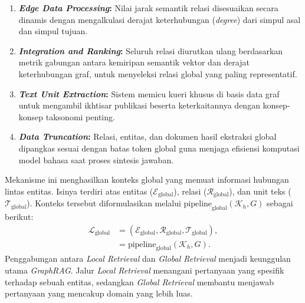 \begin{enumerate}[label=\textbf{\arabic*.}, leftmargin=*, itemsep=10pt, listparindent=0.75cm]
\begin{enumerate}[label=\textbf{\alph*.}, leftmargin=*, itemsep=5pt, listparindent=0.75cm]
\begin{enumerate}[label=\textbf{\arabic*.}, leftmargin=*, itemsep=6pt, listparindent=0.75cm]
                        \item \textbf{\textit{Edge Data Processing}:} Nilai jarak semantik relasi disesuaikan secara dinamis dengan mengalkulasi derajat keterhubungan (\textit{degree}) dari simpul asal dan simpul tujuan.

                        \item \textbf{\textit{Integration and Ranking}:} Seluruh relasi diurutkan ulang berdasarkan metrik gabungan antara kemiripan semantik vektor dan derajat keterhubungan graf, untuk menyeleksi relasi global yang paling representatif.

                        \item \textbf{\textit{Text Unit Extraction}:} Sistem memicu kueri khusus di basis data graf untuk mengambil ikhtisar publikasi beserta keterkaitannya dengan konsep-konsep taksonomi penting.

                        \item \textbf{\textit{Data Truncation}:} Relasi, entitas, dan dokumen hasil ekstraksi global dipangkas sesuai dengan batas token global guna menjaga efisiensi komputasi model bahasa saat proses sintesis jawaban.

                    \end{enumerate}

                    \indent
                    Mekanisme ini menghasilkan konteks global yang memuat informasi hubungan lintas entitas. Isinya terdiri atas entitas ($\mathcal{E}_{\text{global}}$), relasi ($\mathcal{R}_{\text{global}}$), dan unit teks ($\mathcal{T}_{\text{global}}$). Konteks tersebut diformulasikan melalui $\text{pipeline}_{\text{global}}(\mathcal{K}_h, G)$ \citep{chen2025acadrag} sebagai berikut:
                    \begin{align}
                        \mathcal{L}_{\text{global}} & = (\mathcal{E}_{\text{global}}, \mathcal{R}_{\text{global}}, \mathcal{T}_{\text{global}}), \label{eq:global_context_components} \\
                                                    & = \text{pipeline}_{\text{global}}(\mathcal{K}_h, G). \label{eq:global_context_pipeline}
                    \end{align}
                    Penggabungan antara \textit{Local Retrieval} dan \textit{Global Retrieval} menjadi keunggulan utama \textit{GraphRAG}. Jalur \textit{Local Retrieval} menangani pertanyaan yang spesifik terhadap sebuah entitas, sedangkan \textit{Global Retrieval} membantu menjawab pertanyaan yang mencakup domain yang lebih luas.


\end{enumerate}
\end{enumerate}
